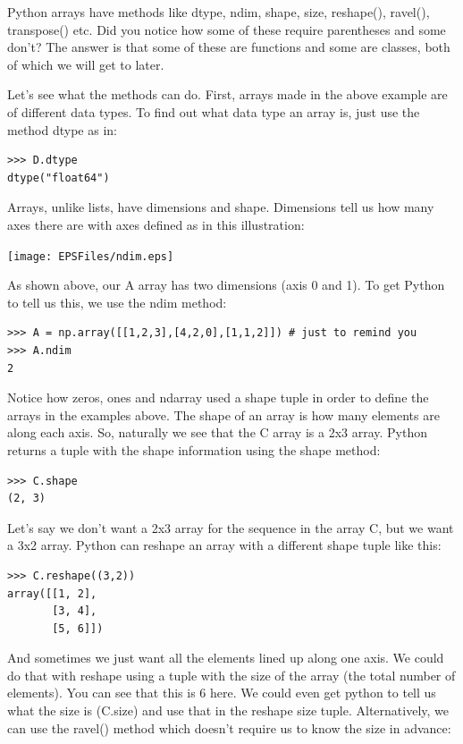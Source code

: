 \documentclass[11pt]{book}
\begin{document}
{{{{Python arrays have methods like {\color{blue}dtype},  {\color{blue}ndim}, {\color{blue}shape}, {\color{blue}size}, {\color{blue}reshape()}, {\color{blue}ravel()},  {\color{blue}transpose()} etc.    Did you notice how some of these require parentheses and some don't? The answer is that some of these are functions and some are classes, both of which we will get to later.

Let's see what the methods can do.
First,  arrays made in the above example are of different data types. To find out what data type an array is, just use the method {\color{blue}dtype} as in:

{ \color{blue} \begin{verbatim}
>>> D.dtype
dtype("float64")
\end{verbatim}}

Arrays, unlike lists, have dimensions and shape.  Dimensions tell us how many axes there are with axes defined as in this illustration:

   \texttt{[image: EPSFiles/ndim.eps]}

As shown above, our {\color{blue}A} array has two dimensions (axis 0 and 1).  To get Python to tell us this, we use the {\color{blue}ndim} method:

   { \color{blue} \begin{verbatim}
>>> A = np.array([[1,2,3],[4,2,0],[1,1,2]]) # just to remind you
>>> A.ndim
2
\end{verbatim}}
Notice how {\color{blue}zeros, ones} and {\color{blue}ndarray} used a shape tuple in order to define the arrays in the examples above.   The shape of an array is how many elements are along each axis.  So, naturally we see that the C array is a 2x3 array.  Python returns a tuple with the shape information using the {\color{blue}shape} method:
{ \color{blue} \begin{verbatim}
>>> C.shape
(2, 3)
\end{verbatim}}

Let's say we don't want a 2x3 array for the sequence in the array {\color{blue}C}, but we want a 3x2 array.  Python can reshape an array with a different shape tuple like this:
   { \color{blue} \begin{verbatim}
>>> C.reshape((3,2))
array([[1, 2],
       [3, 4],
       [5, 6]])
\end{verbatim}}

And sometimes we just want all the elements lined up along one axis. We could do that with {\color{blue}reshape} using a tuple with the size of the array (the total number of elements). You can see that this is 6 here. We could even get python to tell us what the size is ({\color{blue}C.size}) and use that in the reshape size tuple.  Alternatively, we can use the {\color{blue}ravel()} method which doesn't require us to know the size in advance:

}}}}
\end{document}
